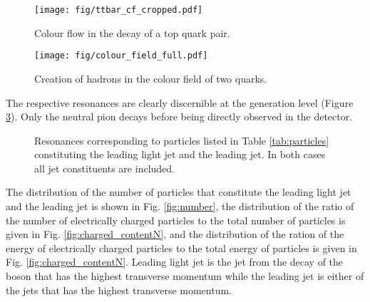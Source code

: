\begin{figure}[hbtp]

\centering
\texttt{[image: fig/ttbar\_cf\_cropped.pdf]}
\caption{Colour flow in the decay of a top quark pair.}
\label{fig:ttbar_cf}

\end{figure}

\begin{figure}[hbtp]
\centering
\texttt{[image: fig/colour\_field\_full.pdf]}
\caption{Creation of hadrons in the colour field of two quarks.}
\label{fig:colour_field}
\end{figure}

The respective resonances are clearly discernible at the generation level (Figure \ref{fig:mass_resonances}). Only the neutral pion decays before being directly observed in the detector.

\begin{figure}[htbp]
\centering
\def\twidth{0.45}
\caption{Resonances corresponding to particles listed in Table \protect\ref{tab:particles} constituting the leading light jet and the leading \cPqb jet. In both cases all jet constituents are included.}
\label{fig:mass_resonances}
\end{figure}

The distribution of the number of particles that constitute the leading light jet and the leading \cPqb jet is shown in Fig. \ref{fig:number}, the distribution of the ratio of the number of electrically charged particles to the total number of particles is given in Fig. \ref{fig:charged_contentN}, and the distribution of the ration of the energy of electrically charged particles to the total energy of particles is given in Fig. \ref{fig:charged_contentN}. Leading light jet is the jet from the decay of the \PW boson that has the highest transverse momentum \pt while the leading \cPqb jet is either of the \cPqb jets that has the highest transverse momentum.

